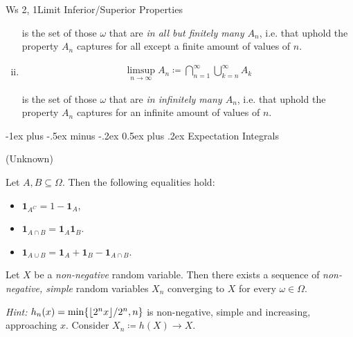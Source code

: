 \documentclass[10pt,landscape]{article}
\makeatletter
\newcommand{\Hint}{\textit{Hint: }}
\newcommand{\Indicator}[1]{\mathbf{1}_{#1}}
\DeclarePairedDelimiter\floor{\lfloor}{\rfloor}
\renewcommand{\section}{\@startsection{section}{1}{0mm}%
                                {-1ex plus -.5ex minus -.2ex}%
                                {0.5ex plus .2ex}%
                                {\normalfont\large\bfseries}}
\makeatother
\begin{document}
\begin{multicols}{3}
\begin{exercise}{Ws 2, 1}{Limit Inferior/Superior Properties}
\begin{enumerate}[(i)]
                is the set of those $\omega$ that are \emph{in all but finitely many $A_n$}, i.e. that uphold the property $A_n$ captures for all except a finite amount of values of $n$.
            \item
                \begin{align*}
                    \limsup_{n \to \infty} A_n \coloneqq \bigcap_{n = 1}^{\infty}\bigcup_{k = n}^{\infty} A_k
                \end{align*}

                is the set of those $\omega$ that are \emph{in infinitely many $A_n$}, i.e. that uphold the property $A_n$ captures for an infinite amount of values of $n$.
        \end{enumerate} 

\end{exercise}


\section{Expectation Integrals}

\begin{proposition}{(Unknown)}{}

    Let $A,B \subseteq \Omega$. Then the following equalities hold:

        \begin{itemize}
            \setlength{\parskip}{0em}
            \item $\Indicator{A^C} = 1 - \Indicator{A}$,
            \item $\Indicator{A \cap B} = \Indicator{A}\Indicator{B}$.
            \item $\Indicator{A \cup B} = \Indicator{A} + \Indicator{B} - \Indicator{A \cap B}$.
        \end{itemize}

\end{proposition}

\begin{lemma}{3.3}{}

    Let $X$ be a \emph{non-negative} random variable. Then there exists a sequence of \emph{non-negative, simple} random variables $X_n$ converging to $X$ for every $\omega \in \Omega$.

    \Hint $h_n(x)=\min\{\floor{2^nx}/2^n, n\}$ is non-negative, simple and increasing, approaching $x$. Consider $X_n \coloneqq h(X) \to X$.


\end{lemma}
\end{multicols}
\end{document}
